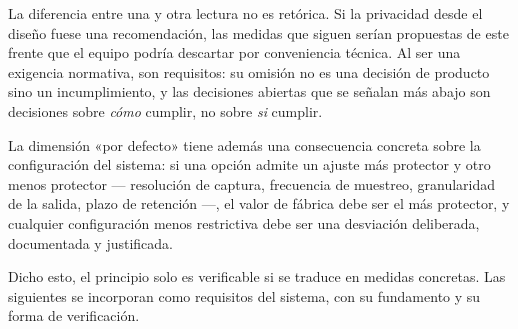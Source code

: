 La diferencia entre una y otra lectura no es retórica. Si la privacidad
desde el diseño fuese una recomendación, las medidas que siguen serían
propuestas de este frente que el equipo podría descartar por
conveniencia técnica. Al ser una exigencia normativa, son requisitos: su
omisión no es una decisión de producto sino un incumplimiento, y las
decisiones abiertas que se señalan más abajo son decisiones sobre
\emph{cómo} cumplir, no sobre \emph{si} cumplir.

La dimensión «por defecto» tiene además una consecuencia concreta sobre
la configuración del sistema: si una opción admite un ajuste más
protector y otro menos protector --- resolución de captura, frecuencia de
muestreo, granularidad de la salida, plazo de retención ---, el valor de
fábrica debe ser el más protector, y cualquier configuración menos
restrictiva debe ser una desviación deliberada, documentada y
justificada.

Dicho esto, el principio solo es verificable si se traduce en medidas
concretas. Las siguientes se incorporan como requisitos del sistema, con
su fundamento y su forma de verificación.

